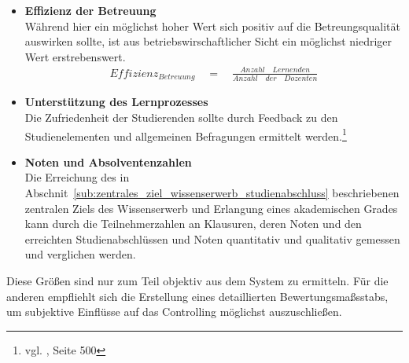 \begin{itemize}
	\item \textbf{Effizienz der Betreuung}\\ Während hier ein möglichst hoher Wert sich positiv auf die Betreungsqualität auswirken sollte, ist aus betriebswirschaftlicher Sicht ein möglichst niedriger Wert erstrebenswert.
\begin{align}
	Effizienz_{ Betreuung }\quad =\quad \frac { Anzahl\quad Lernenden }{ Anzahl\quad der\quad Dozenten } 
\end{align}	
	\item \textbf{Unterstützung des Lernprozesses}\\ Die Zufriedenheit der Studierenden sollte durch Feedback zu den Studienelementen und allgemeinen Befragungen ermittelt werden.\footnote{vgl. \cite{euler}, Seite 500}
	\item \textbf{Noten und Absolventenzahlen}\\ Die Erreichung des in Abschnit~\ref{sub:zentrales_ziel_wissenserwerb_studienabschluss} beschriebenen zentralen Ziels des Wissenserwerb und Erlangung eines akademischen Grades kann durch die Teilnehmerzahlen an Klausuren, deren Noten und den erreichten Studienabschlüssen und Noten quantitativ und qualitativ gemessen und verglichen werden. 
\end{itemize}

Diese Größen sind nur zum Teil objektiv aus dem System zu ermitteln. Für die anderen empfliehlt sich die Erstellung eines detaillierten Bewertungsmaßsstabs, um subjektive Einflüsse auf das Controlling möglichst auszuschließen.


